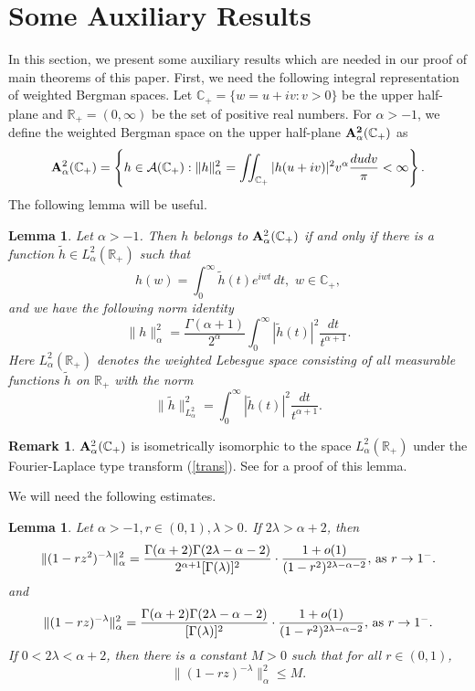 \documentclass[10pt]{amsart}
\newtheorem{lemma}[theorem]{Lemma}
\theoremstyle{definition}    %
\newtheorem{remark}[theorem]{Remark}
\numberwithin{equation}{section}
\begin{document}
\section{{\bf Some Auxiliary Results}}
In this section, we present some auxiliary results which are needed in our proof of main theorems of this paper. First, we need the following integral representation of weighted Bergman spaces. Let $\mathbb{C}_{+} = \{w=u+iv: v>0\}$ be the upper half-plane and $\mathbb{R}_{+}=(0, \infty)$ be the set of positive real numbers. For $\alpha>-1$, we define the weighted Bergman space on the upper half-plane $\bf {A}_{\alpha}^2(\mathbb{C}_{+})$ as 
$$
{\bf {A}}_{\alpha}^2(\mathbb{C}_{+}) = \left\{ h\in \mathcal{A}(\mathbb{C}_{+}):  \|h\|_{\alpha}^{2}=\iint_{\mathbb{C}_{+}} |h(u + iv)|^{2} v^{\alpha} \frac{dudv}{\pi} < \infty \right\}.
$$
The following lemma will be useful. 
\begin{lemma}\label{l-1}Let $\alpha>-1$. Then $h$ belongs to ${\bf {A}}_{\alpha}^2(\mathbb{C}_{+})$ if and only if there is a function $\tilde{h} \in L_{\alpha}^{2}(\mathbb{R}_{+})$ such that
\begin{equation}\label{trans}
h(w) = \int_{0}^{\infty} \tilde{h}(t) e^{i w t} \, dt, \,\,w \in \mathbb{C}_{+},
\end{equation}
and we have the following norm identity 
$$
\|h\|_{\alpha}^{2} = \frac{\Gamma(\alpha+1)}{2^{\alpha}} \int_{0}^{\infty} |\tilde{h}(t)|^{2} \frac{dt}{t^{\alpha+1}}.
$$
Here $L_{\alpha}^{2}(\mathbb{R}_{+})$ denotes the weighted Lebesgue space consisting of all measurable functions $\tilde{h}$ on $\mathbb{R}_{+}$ with the norm
$$
\|\tilde{h}\|_{L_{\alpha}^{2}}^2=\int_{0}^{\infty} |\tilde{h}(t)|^{2} \frac{dt}{t^{\alpha+1}}.
$$
\end{lemma}
\begin{remark}
${\bf {A}}_{\alpha}^2(\mathbb{C}_{+})$ is isometrically isomorphic to the space $L_{\alpha}^{2}(\mathbb{R}_{+})$ under the Fourier-Laplace type transform (\ref{trans}). See \cite{DGM} for a proof of this lemma.\end{remark}
We will need the following estimates.
\begin{lemma}\label{l-2}
Let $\alpha>-1, r\in (0,1), \lambda>0$. If $2\lambda>\alpha+2$, then  
\begin{equation}\label{a-e-1}
 \|{(1-rz^2)^{-\lambda}}\|_{\alpha}^2=\frac{\Gamma(\alpha+2)\Gamma(2\lambda-\alpha-2)}{2^{\alpha+1}[\Gamma(\lambda)]^2}\cdot\frac{1+{o}(1)}{(1-r^2)^{2\lambda-\alpha-2}},\, {\textup{as}}\,\, r\rightarrow 1^{-}. 
 \end{equation}
 and \begin{equation}\label{a-e-2}
   \|{(1-rz)^{-\lambda}}\|_{\alpha}^2=\frac{\Gamma(\alpha+2)\Gamma(2\lambda-\alpha-2)}{[\Gamma(\lambda)]^2}\cdot\frac{1+{o}(1)}{(1-r^2)^{2\lambda-\alpha-2}},\, {\textup{as}}\,\, r\rightarrow 1^{-}. 
 \end{equation} 
 If $0<2\lambda<\alpha+2$, then there is a constant $M>0$ such that for all $r\in (0,1)$,
 \begin{equation}\label{a-e-3}
   \|{(1-rz)^{-\lambda}}\|_{\alpha}^2\leq M.
 \end{equation}\end{lemma} 
\end{document}
